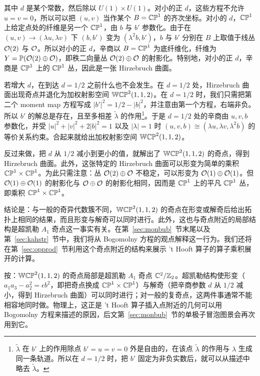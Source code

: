 其中 $d$ 是某个常数，然后除以 $U(1)\times U(1)$。对小的正 $d$，这些方程不允许 $u=v=0$，所以可以把 $(u,v)$ 当作某个 $B=\Bbb{CP}^1$ 的齐次坐标。对小的 $d$，$\Bbb{CP}^1$ 上给定点处的纤维是另一个 $\Bbb{CP}^1$，由 $b$ 与 $b'$ 参数化。由于在 $(u,v)\to (\lambda u,\lambda v)$ 下 $(b,b')$ 变为 $(\lambda^2b,b')$，$b$ 与 $b'$ 分别在 $B$ 上取值于线丛 ${\cal O}(2)$ 与 ${\cal O}$。所以对小的正 $d$，辛商以 $B=\Bbb{CP}^1$ 为底纤维化，纤维为 $Y=\Bbb{P}({\cal O}(2)\oplus {\cal O})$，即秩二向量丛 $\CO(2)\oplus \CO$ 的射影化。特别地，对小的正 $d$，辛商是 $\Bbb{CP}^1$ 上的 $\Bbb{CP}^1$ 丛，因此是一张 Hirzebruch 曲面。

若增大 $d$，在到达 $d=1/2$ 之前什么也不会发生。在 $d=1/2$ 处，Hirzebruch 曲面出现奇点并退化为加权射影空间 $\Bbb{WCP}^2(1,1,2)$。在 $d=1/2$ 时，我们只需把第二个 moment map 方程写成 $|b'|^2=1/2-|b|^2$，并注意由第一个方程，右端非负。所以 $b'$ 的解总是存在，且至多相差 $\tilde\lambda$ 的作用\footnote{$\tilde\lambda$ 在 $b'$ 上的作用除点 $b'=u=v=0$ 外是自由的，在该点 $\tilde\lambda$ 的作用与 $\lambda$ 生成同一条轨道。所以在 $d=1/2$ 时，把 $b'$ 固定为非负实数后，就可以从描述中略去 $\tilde\lambda$。}。于是 $d=1/2$ 处的辛商由 $u,v,b$ 参数化，并受 $|u|^2+|v|^2+2|b|^2=1$ 以及 $|\lambda|=1$ 时 $(u,v,b)\cong (\lambda u,\lambda v,\lambda^2 b)$ 的等价关系约束。合起来就给出加权射影空间 $\Bbb{WCP}^2(1,1,2)$。

反过来做，把 $d$ 从 $1/2$ 减小到更小的值，就解出了 $\Bbb{WCP}^2(1,1,2)$ 的奇点，得到 Hirzebruch 曲面。此外，这张特定的 Hirzebruch 曲面可以形变为简单的乘积 $\Bbb{CP}^1\times \Bbb{CP}^1$。为此只需注意：丛 $\CO(2)\oplus \CO$ 不稳定，可以形变为 $\CO(1)\oplus \CO(1)$。但 $\CO(1)\oplus \CO(1)$ 的射影化与 $\CO\oplus \CO$ 的射影化相同，因而是 $\Bbb{CP}^1$ 上的平凡 $\Bbb{CP}^1$ 丛，即乘积 $\Bbb{CP}^1\times \Bbb{CP}^1$。

结论是：与一般的奇异代数簇不同，$\Bbb{WCP}^2(1,1,2)$ 的奇点在形变或解奇后给出拓扑上相同的结果，而且形变与解奇可以同时进行。此外，这也与奇点附近的局部结构是超凯勒 $A_1$ 奇点这一事实有关。在第~\ref{sec:monbub}~节末尾以及第~\ref{sec:kahstr}~节中，我们将从 Bogomolny 方程的观点解释这一行为。我们还将在第~\ref{sec:opprod}~节利用这个奇点附近的结构来展示 't Hooft 算子的算子乘积展开的计算。

\begin{yizhu}[物理图像]
按：$\Bbb{WCP}^2(1,1,2)$ 的奇点局部是超凯勒 $A_1$ 奇点 $\Bbb{C}^2/\Bbb{Z}_2$。超凯勒结构使形变（$a_1a_3-a_2^2=\epsilon b^2$，即把奇点换成 $\Bbb{CP}^1\times\Bbb{CP}^1$）与解奇（把辛商参数 $d$ 从 $1/2$ 减小，得到 Hirzebruch 曲面）可以同时进行；对一般的复奇点，这两件事通常不能相容地同时做。物理上，这正是 't Hooft 算子插入点附近的几何可以用 Bogomolny 方程来描述的原因，后文第~\ref{sec:monbub}~节的单极子冒泡图景会再次用到它。
\end{yizhu}

